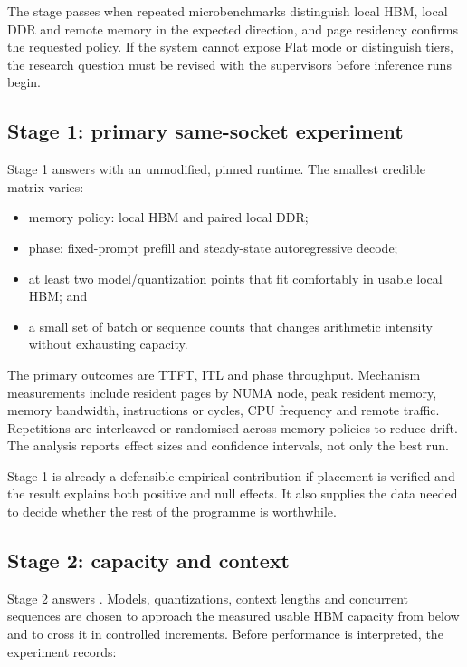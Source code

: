 The stage passes when repeated microbenchmarks distinguish local HBM,
local DDR and remote memory in the expected direction, and page
residency confirms the requested policy.  If the system cannot expose
Flat mode or distinguish tiers, the research question must be revised
with the supervisors before inference runs begin.

\subsection{Stage 1: primary same-socket experiment}

Stage 1 answers  with an unmodified, pinned runtime.  The smallest
credible matrix varies:

\begin{itemize}
  \item memory policy: local HBM and paired local DDR;
  \item phase: fixed-prompt prefill and steady-state autoregressive
        decode;
  \item at least two model/quantization points that fit comfortably in
        usable local HBM; and
  \item a small set of batch or sequence counts that changes arithmetic
        intensity without exhausting capacity.
\end{itemize}

The primary outcomes are TTFT, ITL and phase throughput.  Mechanism
measurements include resident pages by NUMA node, peak resident memory,
memory bandwidth, instructions or cycles, CPU frequency and remote
traffic.  Repetitions are interleaved or randomised across memory
policies to reduce drift.  The analysis reports effect sizes and
confidence intervals, not only the best run.

Stage 1 is already a defensible empirical contribution if placement is
verified and the result explains both positive and null effects.  It
also supplies the data needed to decide whether the rest of the
programme is worthwhile.

\subsection{Stage 2: capacity and context}

Stage 2 answers .  Models, quantizations, context lengths and
concurrent sequences are chosen to approach the measured usable HBM
capacity from below and to cross it in controlled increments.  Before
performance is interpreted, the experiment records:

